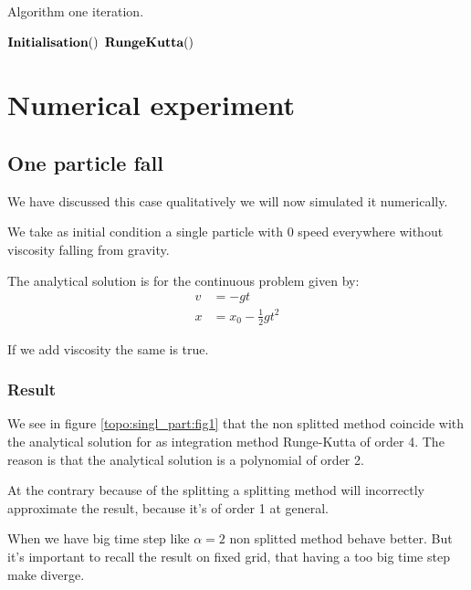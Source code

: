 \begin{algorithm}
\caption{Algorithm one iteration.}
\label{code:RungeKutta3}
\begin{algorithmic}[1]
\State $\mathop{\textbf{Initialisation}}()$
\State $\mathop{\textbf{RungeKutta}}()$
\EndProcedure
        \end{algorithmic}
\end{algorithm}

\FloatBarrier
\section{Numerical experiment}

\subsection{One particle fall}
\label{top:exp:one}
We have discussed this case qualitatively we will now simulated it numerically.

We take as initial condition a single particle with 0 speed everywhere without viscosity falling from gravity.

The analytical solution is for the continuous problem given by:
\begin{align}
v&=-gt\\
x&=x_0-\frac{1}{2}gt^2
\end{align}

If we add viscosity the same is true.

\subsubsection{Result}

We see in figure \ref{topo:singl_part:fig1} that the non splitted method coincide with the analytical solution for as
integration method Runge-Kutta of order 4. The reason is that the analytical solution is a polynomial of order 2.

At the contrary because of the splitting a splitting method will incorrectly approximate the result, because it's of order 1 at general.

When we have big time step like $\alpha=2$ non splitted method behave better. But it's important to recall the result on fixed grid,
that having a too big time step make diverge.

